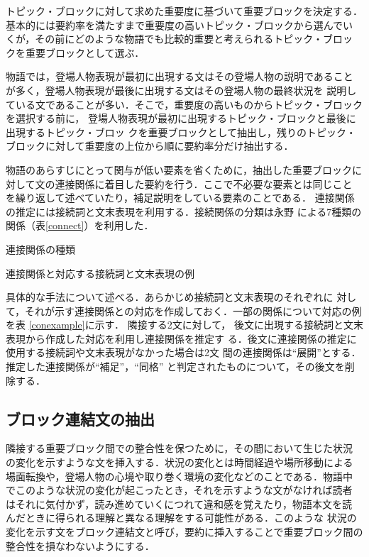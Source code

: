 \documentclass[japanese]{jnlp_1.4}
\begin{document}
  トピック・ブロックに対して求めた重要度に基づいて重要ブロックを決定する．
  基本的には要約率を満たすまで重要度の高いトピック・ブロックから選んでい
  くが，その前にどのような物語でも比較的重要と考えられるトピック・ブロッ
  クを重要ブロックとして選ぶ．

  物語では，登場人物表現が最初に出現する文はその登場人物の説明であること
  が多く，登場人物表現が最後に出現する文はその登場人物の最終状況を
  説明している文であることが多い．そこで，重要度の高いものからトピック・ブロックを選択する前に，
  登場人物表現が最初に出現するトピック・ブロックと最後に出現するトピック・ブロッ
  クを重要ブロックとして抽出し，残りのトピック・ブロックに対して重要度の上位から順に要約率分だけ抽出する．

  物語のあらすじにとって関与が低い要素を省くために，抽出した重要ブロックに
  対して文の連接関係に着目した要約を行う．ここで不必要な要素とは同じこと
  を繰り返して述べていたり，補足説明をしている要素のことである．
  連接関係の推定には接続詞と文末表現を利用する．接続関係の分類は永野
  \cite{bunsyouron}による7種類の関係（表\ref{connect}）を利用した．

  \begin{table}[t]
    \caption{連接関係の種類}\label{connect}
   \begin{center}

   \end{center}  
  \end{table}
  \begin{table}[t]
    \caption{連接関係と対応する接続詞と文末表現の例}\label{conexample}
   \begin{center}

   \end{center}
  \end{table}

  具体的な手法について述べる．あらかじめ接続詞と文末表現のそれぞれに
  対して，それが示す連接関係との対応を作成しておく．一部の関係について対応の例を表
  \ref{conexample}に示す．
隣接する2文に対して，
  後文に出現する接続詞と文末表現から作成した対応を利用し連接関係を推定す
  る．後文に連接関係の推定に使用する接続詞や文末表現がなかった場合は2文
  間の連接関係は``展開''とする．推定した連接関係が``補足''，``同格''
  と判定されたものについて，その後文を削除する． 


  \subsection{ブロック連結文の抽出}\label{connectsentence}

  隣接する重要ブロック間での整合性を保つために，その間において生じた状況
  の変化を示すような文を挿入する．状況の変化とは時間経過や場所移動による
  場面転換や，登場人物の心境や取り巻く環境の変化などのことである．物語中
  でこのような状況の変化が起こったとき，それを示すような文がなければ読者
  はそれに気付かず，読み進めていくにつれて違和感を覚えたり，物語本文を読
  んだときに得られる理解と異なる理解をする可能性がある．このような
  状況の変化を示す文をブロック連結文と呼び，要約に挿入することで重要ブロック間の整合性を損なわないようにする．
\end{document}
